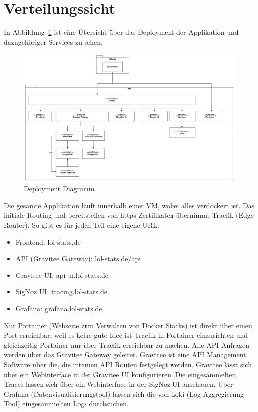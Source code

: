 \section{Verteilungssicht}

In Abbildung~\ref{fig:deployment-diagram} ist eine Übersicht über das Deployment der Applikation und dazugehöriger
Services zu sehen.
\begin{figure}
    \centering
    \includegraphics[width=\textwidth]{images/cdc-08-deployment-diagram.drawio}
    \caption{Deployment Diagramm}
    \label{fig:deployment-diagram}
\end{figure}

Die gesamte Applikation läuft innerhalb einer VM, wobei alles verdockert ist.
Das initiale Routing und bereitstellen von https Zertifikaten übernimmt Traefik (Edge Router).
So gibt es für jeden Teil eine eigene URL:
\begin{itemize}
    \item Frontend: lol-stats.de
    \item API (Gravitee Gateway): lol-stats.de/api
    \item Gravitee UI: api-ui.lol-stats.de
    \item SigNoz UI: tracing.lol-stats.de
    \item Grafana: grafana.lol-stats.de
\end{itemize}

Nur Portainer (Webseite zum Verwalten von Docker Stacks) ist direkt über einen Port erreichbar, weil es keine gute Idee ist Traefik in Portainer einzurichten
und gleichzeitig Portainer nur über Traefik erreichbar zu machen.
Alle API Anfragen werden über das Gravitee Gateway geleitet.
Gravitee ist eine API Management Software über die, die internen API Routen festgelegt werden.
Gravitee lässt sich über ein Webinterface in der Gravitee UI konfigurieren.
Die eingesammelten Traces lassen sich über ein Webinterface in der SigNoz UI anschauen.
Über Grafana (Datenvisualisierungstool) lassen sich die von Loki (Log-Aggregierung-Tool) eingesammelten Logs durchsuchen.
